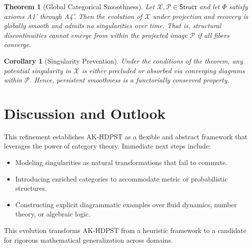 \documentclass[11pt]{article}
\newtheorem{theorem}[definition]{Theorem}
\newtheorem{corollary}[definition]{Corollary}
\begin{document}
\begin{theorem}[Global Categorical Smoothness]
Let \( \mathcal{X}, \mathcal{P} \in \mathsf{Struct} \) and let \( \Phi \) satisfy axioms A1' through A4'. Then the evolution of \( \mathcal{X} \) under projection and recovery is globally smooth and admits no singularities over time. That is, structural discontinuities cannot emerge from within the projected image \( \mathcal{P} \) if all fibers converge.
\end{theorem}

\begin{corollary}[Singularity Prevention]
Under the conditions of the theorem, any potential singularity in \( \mathcal{X} \) is either precluded or absorbed via converging diagrams within \( \mathcal{P} \). Hence, persistent smoothness is a functorially conserved property.
\end{corollary}

\section{Discussion and Outlook}

This refinement establishes AK-HDPST as a flexible and abstract framework that leverages the power of category theory. Immediate next steps include:

\begin{itemize}
  \item Modeling singularities as natural transformations that fail to commute.
  \item Introducing enriched categories to accommodate metric or probabilistic structures.
  \item Constructing explicit diagrammatic examples over fluid dynamics, number theory, or algebraic logic.
\end{itemize}

This evolution transforms AK-HDPST from a heuristic framework to a candidate for rigorous mathematical generalization across domains.
\end{document}

